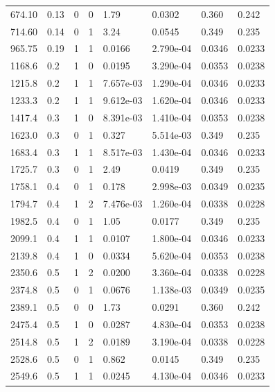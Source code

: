 \documentclass[preview]{standalone}
\begin{document}
{{\begin{tabular}{L{1.2cm}C{1.2cm} C{0.3cm}C{0.5cm} C{1.4cm}C{1.4cm} C{1.4cm}C{1.4cm}}
  674.10  &  0.13  & 0     &  0 &  1.79  & 0.0302  & 0.360 &  0.242   \\ 
  714.60  &  0.14  & 0     &  1 &  3.24  & 0.0545  & 0.349 &  0.235   \\ 
  965.75  &  0.19  & 1     &  1 &  0.0166  & 2.790e-04  & 0.0346 &  0.0233   \\ 
  1168.6  &   0.2  & 1     &  0 &  0.0195  & 3.290e-04  & 0.0353 &  0.0238   \\ 
  1215.8  &   0.2  & 1     &  1 &  7.657e-03  & 1.290e-04  & 0.0346 &  0.0233   \\ 
  1233.3  &   0.2  & 1     &  1 &  9.612e-03  & 1.620e-04  & 0.0346 &  0.0233   \\ 
  1417.4  &   0.3  & 1     &  0 &  8.391e-03  & 1.410e-04  & 0.0353 &  0.0238   \\ 
  1623.0  &   0.3  & 0     &  1 &  0.327  & 5.514e-03  & 0.349 &  0.235   \\ 
  1683.4  &   0.3  & 1     &  1 &  8.517e-03  & 1.430e-04  & 0.0346 &  0.0233   \\ 
  1725.7  &   0.3  & 0     &  1 &  2.49  & 0.0419  & 0.349 &  0.235   \\ 
  1758.1  &   0.4  & 0     &  1 &  0.178  & 2.998e-03  & 0.0349 &  0.0235   \\ 
  1794.7  &   0.4  & 1     &  2 &  7.476e-03  & 1.260e-04  & 0.0338 &  0.0228   \\ 
  1982.5  &   0.4  & 0     &  1 &  1.05  & 0.0177  & 0.349 &  0.235   \\ 
  2099.1  &   0.4  & 1     &  1 &  0.0107  & 1.800e-04  & 0.0346 &  0.0233   \\ 
  2139.8  &   0.4  & 1     &  0 &  0.0334  & 5.620e-04  & 0.0353 &  0.0238   \\ 
  2350.6  &   0.5  & 1     &  2 &  0.0200  & 3.360e-04  & 0.0338 &  0.0228   \\ 
  2374.8  &   0.5  & 0     &  1 &  0.0676  & 1.138e-03  & 0.0349 &  0.0235   \\ 
  2389.1  &   0.5  & 0     &  0 &  1.73  & 0.0291  & 0.360 &  0.242   \\ 
  2475.4  &   0.5  & 1     &  0 &  0.0287  & 4.830e-04  & 0.0353 &  0.0238   \\ 
  2514.8  &   0.5  & 1     &  2 &  0.0189  & 3.190e-04  & 0.0338 &  0.0228   \\ 
  2528.6  &   0.5  & 0     &  1 &  0.862  & 0.0145  & 0.349 &  0.235   \\ 
  2549.6  &   0.5  & 1     &  1 &  0.0245  & 4.130e-04  & 0.0346 &  0.0233   \\ 

\end{tabular}}}
\end{document}
